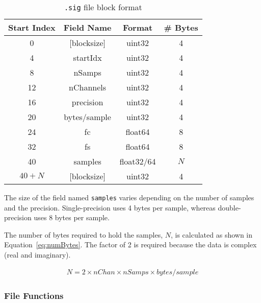 \renewcommand\arraystretch{1.5}
\begin{table}[h]
\caption{\texttt{.sig} file block format} \label{tab:sigFileFormat}
\begin{center}
\begin{tabular}{|c|c|c|c|}
\hline
 Start Index  &   Field Name   &   Format    &   \# Bytes   \\
\hline \hline
       0      &   [blocksize]  &   uint32    &       4      \\
\hline
       4      &    startIdx    &   uint32    &       4      \\
\hline
       8      &    nSamps      &   uint32    &       4      \\
\hline
       12     &    nChannels   &   uint32    &       4      \\
\hline
       16     &    precision   &   uint32    &       4      \\
\hline
       20     &  bytes/sample  &   uint32    &       4      \\
\hline
       24     &     fc         &  float64    &       8      \\
\hline
       32     &     fs         &  float64    &       8      \\
\hline
       40     &    samples     & float32/64  &       $N$      \\
\hline
      $40+N$  &   [blocksize]  &   uint32    &       4      \\
\hline
\end{tabular}
\end{center}
\end{table}

The size of the field named \verb+samples+ varies depending on the
number of samples and the precision.  Single-precision uses 4 bytes
per sample, whereas double-precision uses 8 bytes per sample.

The number of bytes required to hold the samples, $N$, is calculated
as shown in Equation~\ref{eq:numBytes}.  The factor of 2 is required
because the data is complex (real and imaginary).

\begin{eqnarray} \label{eq:numBytes}
    N = 2 \times nChan\times nSamps\times bytes/sample
\end{eqnarray}

\subsubsection{File Functions}

